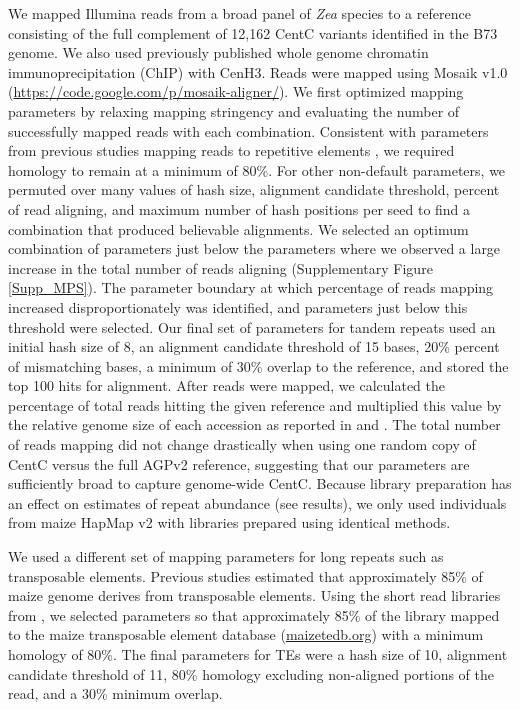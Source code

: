 We mapped Illumina reads from a broad panel of \emph{Zea} species \citep{Chia2012,Tenaillon2011}  to a reference consisting of the full complement of 12,162 CentC variants identified in the B73 genome.  We also used previously published whole genome chromatin immunoprecipitation (ChIP) \citep{Wolfgruber2009, Wang2013} with CenH3.  Reads were mapped using  Mosaik v1.0 (\url{https://code.google.com/p/mosaik-aligner/}). We first optimized mapping parameters by relaxing mapping stringency and evaluating the number of successfully mapped reads with each combination.  Consistent with parameters from previous studies mapping reads to repetitive elements \citep{Tenaillon2011}, we required homology to remain at a minimum of 80\%.  For other non-default parameters, we permuted over many values of hash size, alignment candidate threshold,  percent of read aligning, and maximum number of hash positions per seed to find a combination that produced believable alignments.  We selected an optimum combination of parameters just below the parameters where we observed a large increase in the total number of reads aligning (Supplementary Figure \ref{Supp_MPS}).  The parameter boundary at which percentage of reads mapping increased disproportionately was identified, and parameters just below this threshold were selected.  Our final set of parameters for tandem repeats used an initial hash size of 8, an alignment candidate threshold of 15 bases, 20\% percent of mismatching bases, a minimum of 30\% overlap to the reference, and stored the top 100 hits for alignment.  After reads were mapped, we calculated the percentage of total reads hitting the given reference and multiplied this value by the relative genome size of each accession as reported in \citet{Chia2012} and \citet{Tenaillon2011}. The total number of reads mapping did not change drastically when using one random copy of CentC versus the full AGPv2 reference, suggesting that our parameters are sufficiently broad to capture genome-wide CentC.  Because library preparation has an effect on estimates of repeat abundance (see results), we only used individuals from maize HapMap v2 \citep{Chia2012} with libraries prepared using identical methods.
	
We used a different set of mapping parameters for long repeats such as transposable elements.  Previous studies \citep{Schnable2009} estimated that approximately 85\% of maize genome derives from transposable elements.  Using the short read libraries from \citet{Tenaillon2011}, we selected parameters so that approximately 85\% of the library mapped to the maize transposable element database (\url{maizetedb.org}) with a minimum homology of 80\%.  The final parameters for TEs were a hash size of 10, alignment candidate threshold of 11, 80\% homology excluding non-aligned portions of the read, and a 30\% minimum overlap.

